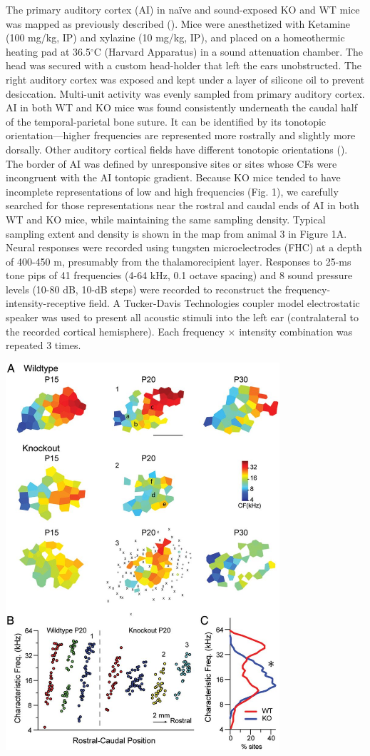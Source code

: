 The primary auditory cortex (AI) in na\"ive and sound-exposed KO and WT mice was mapped as previously described (\cite{Kim2009}). Mice were anesthetized with Ketamine (100 mg/kg, IP) and xylazine (10 mg/kg, IP), and placed on a homeothermic heating pad at 36.5$^\circ$C (Harvard Apparatus) in a sound attenuation chamber. The head was secured with a custom head-holder that left the ears unobstructed. The right auditory cortex was exposed and kept under a layer of silicone oil to prevent desiccation. Multi-unit activity was evenly sampled from primary auditory cortex. AI in both WT and KO mice was found consistently underneath the caudal half of the temporal-parietal bone suture. It can be identified by its tonotopic orientation---higher frequencies are represented more rostrally and slightly more dorsally. Other auditory cortical fields have different tonotopic orientations (\cite{Guo2012}). The border of AI was defined by unresponsive sites or sites whose CFs were incongruent with the AI tontopic gradient. Because KO mice tended to have incomplete representations of low and high frequencies (Fig. 1), we carefully searched for those representations near the rostral and caudal ends of AI in both WT and KO mice, while maintaining the same sampling density. Typical sampling extent and density is shown in the map from animal 3 in Figure 1A. Neural responses were recorded using tungsten microelectrodes (FHC) at a depth of 400-450 \textmu m, presumably from the thalamorecipient layer. Responses to 25-ms tone pips of 41 frequencies (4-64 kHz, 0.1 octave spacing) and 8 sound pressure levels (10-80 dB, 10-dB steps) were recorded to reconstruct the frequency-intensity-receptive field. A Tucker-Davis Technologies coupler model electrostatic speaker was used to present all acoustic stimuli into the left ear (contralateral to the recorded cortical hemisphere). Each frequency $\times$ intensity combination was repeated 3 times.

\centerline{\includegraphics[width=4in]{images/C3F1}}

